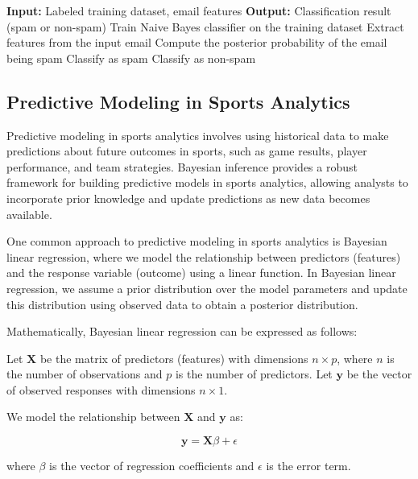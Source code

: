 \documentclass[12pt]{book} %
\begin{document}
\FloatBarrier
\begin{algorithm}
\caption{Bayesian Spam Filtering Algorithm}\label{alg:spam_filtering}
\begin{algorithmic}[1]
\State \textbf{Input:} Labeled training dataset, email features
\State \textbf{Output:} Classification result (spam or non-spam)
\State Train Naive Bayes classifier on the training dataset
\State Extract features from the input email
\State Compute the posterior probability of the email being spam
    \State Classify as spam
\Else
    \State Classify as non-spam
\EndIf
\end{algorithmic}
\end{algorithm}
\FloatBarrier

\subsection{Predictive Modeling in Sports Analytics}

Predictive modeling in sports analytics involves using historical data to make predictions about future outcomes in sports, such as game results, player performance, and team strategies. Bayesian inference provides a robust framework for building predictive models in sports analytics, allowing analysts to incorporate prior knowledge and update predictions as new data becomes available.

One common approach to predictive modeling in sports analytics is Bayesian linear regression, where we model the relationship between predictors (features) and the response variable (outcome) using a linear function. In Bayesian linear regression, we assume a prior distribution over the model parameters and update this distribution using observed data to obtain a posterior distribution.

Mathematically, Bayesian linear regression can be expressed as follows:

Let \( \mathbf{X} \) be the matrix of predictors (features) with dimensions \( n \times p \), where \( n \) is the number of observations and \( p \) is the number of predictors. Let \( \mathbf{y} \) be the vector of observed responses with dimensions \( n \times 1 \).

We model the relationship between \( \mathbf{X} \) and \( \mathbf{y} \) as:

\[
\mathbf{y} = \mathbf{X}\beta + \epsilon
\]

where \( \beta \) is the vector of regression coefficients and \( \epsilon \) is the error term.
\end{document}
